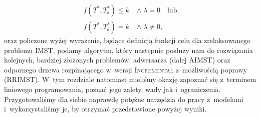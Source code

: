 \begin{align}
	f \left( T^{\ast}, T^{\ast}_{\textbf{s}} \right) \leqslant k \; & \wedge \; \lambda = 0 \quad \text{lub}\label{eq:imstoptcond1}\\
	f \left( T^{\ast}, T^{\ast}_{\textbf{s}} \right) = k \; & \wedge \; \lambda \neq 0\text{,}\label{eq:imstoptcond2}
\end{align}
oraz policzone wyżej wyrażenie, będące definicją funkcji celu dla zrelaksowanego problemu \textsc{IMST}, podamy algorytm, który następnie posłuży nam do rozwiązania kolejnych, bardziej złożonych problemów: adwersarza (dalej \textsc{AIMST}) oraz odpornego drzewa rozpinającego w~wersji \textsc{Incremental} z~możliwością poprawy (\textsc{RRIMST}).
W~tym rozdziale natomiast mieliśmy okazję zapoznać się z~terminem liniowego programowania, poznać jego zalety, wady jak i~ograniczenia. 
Przygotowaliśmy dla siebie naprawdę potężne narzędzia do pracy z~modelami i~wykorzystaliśmy je, by otrzymać przedstawione powyżej wyniki.